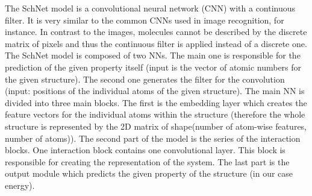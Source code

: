 The SchNet model\cite{Schuett2018SchNet} is a convolutional neural network (CNN) with a continuous filter. It is very similar to the common CNNs used in image recognition, for instance. In contrast to the images, molecules cannot be described by the discrete matrix of pixels and thus the continuous filter is applied instead of a discrete one. The SchNet model is composed of two NNs. The main one is responsible for the prediction of the given property itself (input is the vector of atomic numbers for the given structure). The second one generates the filter for the convolution (input: positions of the individual atoms of the given structure). The main NN is divided into three main blocks. The first is the embedding layer which creates the feature vectors for the individual atoms within the structure (therefore the whole structure is represented by the 2D matrix of shape(number of atom-wise features, number of atoms)). The second part of the model is the series of the interaction blocks. One interaction block contains one convolutional layer. This block is responsible for creating the representation of the system. The last part is the output module which predicts the given property of the structure (in our case energy).

